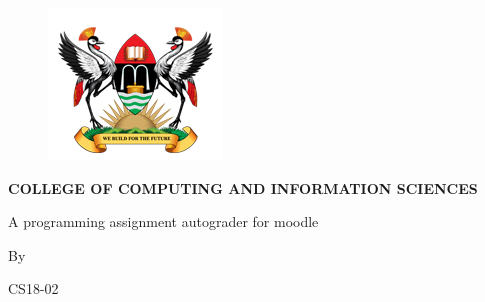 \documentclass[12pt]{article}
\begin{document}
\begin{figure}
	\begin{center} \includegraphics[width=0.2\linewidth]{maklogo.png} \end{center}
\end{figure}

	\begin{center} \begin{Large} \textbf { COLLEGE OF COMPUTING  AND INFORMATION SCIENCES} \end{Large}  \end{center} 
	\begin{center} \begin{Large} A programming assignment autograder for moodle \end{Large} \end{center}
	\begin{center} \begin{Large} By \end{Large} \end{center}
	\begin{center} \begin{Large} CS18-02\\[1in] \end{Large} \end{center}
	
\end{document}
